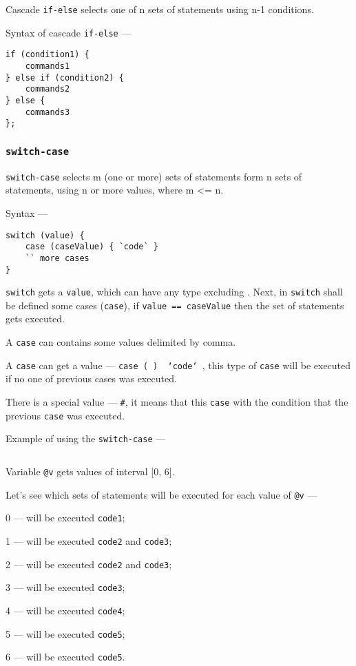 Cascade \texttt{if-else} selects one of n sets of statements using n-1 conditions.

Syntax of cascade \texttt{if-else} —
\begin{verbatim}
if (condition1) {
	commands1
} else if (condition2) {
	commands2
} else {
	commands3
};
\end{verbatim}

\subsubsection{\texttt{switch-case}}

\texttt{switch-case} selects m (one or more) sets of statements form n sets of statements, using n or more values, where m <= n.

Syntax —
\begin{verbatim}
switch (value) {
	case (caseValue) { `code` }
	`` more cases
}
\end{verbatim}

\texttt{switch} gets a \texttt{value}, which can have any type excluding \bool. Next, in \texttt{switch} shall be defined some cases (\texttt{case}), if \texttt{value == caseValue} then the set of statements gets executed.

A \texttt{case} can contains some values delimited by comma.

A \texttt{case} can get a \void{} value — \texttt{case (~) { `code` }}, this type of \texttt{case} will be executed if no one of previous cases was executed.

There is a special value — \texttt{#}, it means that this \texttt{case} with the condition that the previous \texttt{case} was executed.

Example of using the \texttt{switch-case} —
\inputminted[linenos]{icl}{../sources/switchcaseex.icL}

Variable \texttt{@v} gets values of interval [0, 6].

\newpage
Let's see which sets of statements will be executed for each value of \texttt{@v} —
\begin{icItems}
	\item 0 — will be executed \texttt{code1};
	\item 1 — will be executed \texttt{code2} and \texttt{code3};
	\item 2 — will be executed \texttt{code2} and \texttt{code3};
	\item 3 — will be executed \texttt{code3};
	\item 4 — will be executed \texttt{code4};
	\item 5 — will be executed \texttt{code5};
	\item 6 — will be executed \texttt{code5}.
\end{icItems}


